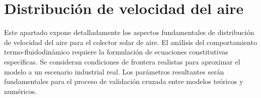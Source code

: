 \section{Distribución de velocidad del aire}
\label{sec:cap09_velocidad}

Este apartado expone detalladamente los aspectos fundamentales de distribución de velocidad del aire para el colector solar de aire.
El análisis del comportamiento termo-fluidodinámico requiere la formulación de ecuaciones constitutivas específicas.
Se consideran condiciones de frontera realistas para aproximar el modelo a un escenario industrial real.
Los parámetros resultantes serán fundamentales para el proceso de validación cruzada entre modelos teóricos y numéricos.
